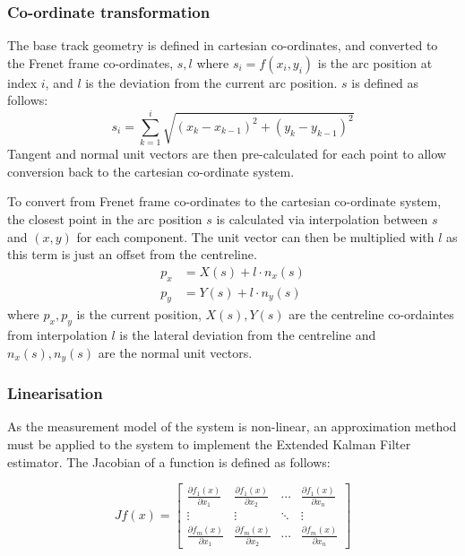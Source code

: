 \subsubsection{Co-ordinate transformation}
The base track geometry is defined in cartesian co-ordinates, and converted to the Frenet frame co-ordinates, $s, l$ where $s_i = f(x_i,y_i)$ is the arc position at index $i$, and $l$ is the deviation from the current arc position. $s$ is defined as follows:
\begin{equation}
\label{eq:frenet-frame}
    s_i = \sum_{k=1}^{i} \sqrt{(x_{k} - x_{k-1})^2 + (y_{k} - y_{k-1})^2}
\end{equation}
Tangent and normal unit vectors are then pre-calculated for each point to allow conversion back to the cartesian co-ordinate system.

To convert from Frenet frame co-ordinates to the cartesian co-ordinate system, the closest point in the arc position $s$ is calculated via interpolation between $s$ and $(x,y)$ for each component. The unit vector can then be multiplied with $l$ as this term is just an offset from the centreline.
\begin{equation}
    \begin{aligned}
        p_x &= X(s) + l \cdot n_x(s) \\
        p_y &= Y(s) + l \cdot n_y(s)
    \end{aligned}
\end{equation}
where $p_x, p_y$ is the current position, $X(s), Y(s)$ are the centreline co-ordaintes from interpolation $l$ is the lateral deviation from the centreline and $n_x(s), n_y(s)$ are the normal unit vectors.

\subsubsection{Linearisation}

As the measurement model of the system is non-linear, an approximation method must be applied to the system to implement the Extended Kalman Filter estimator\cite{sopasakis_2026_estimationtheorynotebooks}. The Jacobian of a function is defined as follows:

\begin{equation}
\label{eq:jacobian}
Jf(x) = \begin{bmatrix}
    \tfrac{\partial f_1(x)}{\partial x_1} & \tfrac{\partial f_1(x)}{\partial x_2} & \cdots & \tfrac{\partial f_1(x)}{\partial x_n}
    \\
    \vdots                                & \vdots                                & \ddots & \vdots
    \\
    \tfrac{\partial f_m(x)}{\partial x_1} & \tfrac{\partial f_m(x)}{\partial x_2} & \cdots & \tfrac{\partial f_m(x)}{\partial x_n}
\end{bmatrix}
\end{equation}

